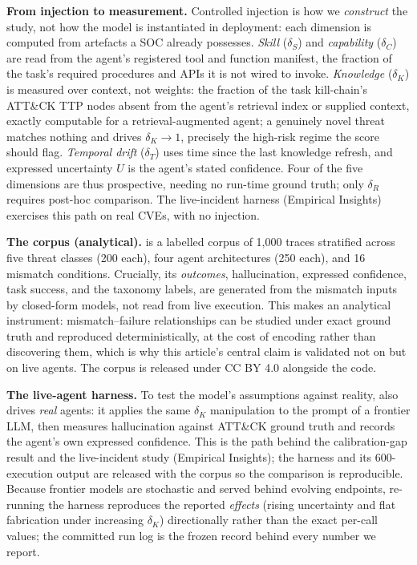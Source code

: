 \textbf{From injection to measurement.} Controlled injection is how we
\textit{construct} the study, not how the model is instantiated in
deployment: each dimension is computed from artefacts a SOC already
possesses. \textit{Skill} ($\delta_S$) and \textit{capability}
($\delta_C$) are read from the agent's registered tool and function
manifest, the fraction of the task's required procedures and APIs it is
not wired to invoke. \textit{Knowledge} ($\delta_K$) is measured over
context, not weights: the fraction of the task kill-chain's ATT\&CK TTP
nodes absent from the agent's retrieval index or supplied context,
exactly computable for a retrieval-augmented agent; a genuinely novel
threat matches nothing and drives $\delta_K \to 1$, precisely the
high-risk regime the score should flag. \textit{Temporal drift}
($\delta_T$) uses time since the last knowledge refresh, and expressed
uncertainty $U$ is the agent's stated confidence. Four of the five
dimensions are thus prospective, needing no run-time ground truth; only
$\delta_R$ requires post-hoc comparison. The live-incident harness
(Empirical Insights) exercises this path on real CVEs, with no
injection.

\textbf{The \SAFK{} corpus (analytical).} \SAFK{} is a labelled corpus
of 1{,}000 traces stratified across five threat classes (200 each),
four agent architectures (250 each), and 16 mismatch conditions.
Crucially, its \textit{outcomes}, hallucination, expressed confidence,
task success, and the taxonomy labels, are generated from the mismatch
inputs by closed-form models, not read from live execution. This makes \SAFK{} an analytical instrument: mismatch--failure
relationships can be studied under exact ground truth and reproduced
deterministically, at the cost of encoding rather than discovering
them, which is why this article's central claim is validated not on
\SAFK{} but on live agents. The corpus is released under CC BY 4.0
alongside the code.

\textbf{The live-agent harness.} To test the model's assumptions
against reality, \ARESBench{} also drives \textit{real} agents: it
applies the same $\delta_K$ manipulation to the prompt of a
frontier LLM, then measures hallucination against ATT\&CK ground truth
and records the agent's own expressed confidence. This is the path
behind the calibration-gap result and the live-incident study
(Empirical Insights); the harness and its 600-execution output are
released with the corpus so the comparison is reproducible. Because
frontier models are stochastic and served behind evolving endpoints,
re-running the harness reproduces the reported \textit{effects}
(rising uncertainty and flat fabrication under increasing $\delta_K$)
directionally rather than the exact per-call values; the committed
run log is the frozen record behind every number we report.
